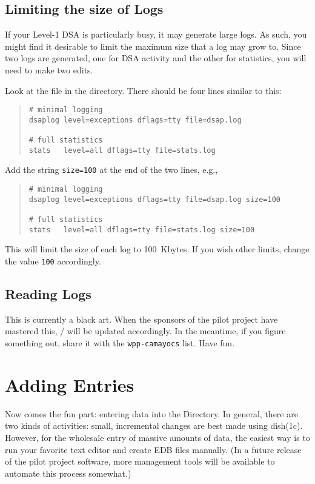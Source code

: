 \subsection	{Limiting the size of Logs}
If your Level-1 DSA is particularly busy,
it may generate large logs.
As such,
you might find it desirable to limit the maximum size that a log may grow to.
Since two logs are generated,
one for DSA activity and the other for statistics,
you will need to make two edits.

Look at the  file in the  directory.
There should be four lines similar to this:
\begin{quote}\small\begin{verbatim}
# minimal logging
dsaplog	level=exceptions dflags=tty file=dsap.log

# full statistics
stats	level=all dflags=tty file=stats.log
\end{verbatim}\end{quote}
Add the string \verb"size=100" at the end of the two lines,
e.g.,
\begin{quote}\small\begin{verbatim}
# minimal logging
dsaplog	level=exceptions dflags=tty file=dsap.log size=100

# full statistics
stats	level=all dflags=tty file=stats.log size=100
\end{verbatim}\end{quote}
This will limit the size of each log to 100~Kbytes.
If you wish other limits,
change the value \verb"100" accordingly.

\subsection	{Reading Logs}
This is currently a black art.
When the sponsors of the pilot project have mastered this,
\theguide/ will be updated accordingly.
In the meantime,
if you figure something out,
share it with the \verb"wpp-camayocs" list.
Have fun.

\section	{Adding Entries}
Now comes the fun part:
entering data into the Directory.
In general,
there are two kinds of activities:
small, incremental changes are best made using \man dish(1c).
However,
for the wholesale entry of massive amounts of data,
the easiest way is to run your favorite text editor and create EDB files
manually. 
(In a future release of the pilot project software,
more management tools will be available to automate this process somewhat.)

